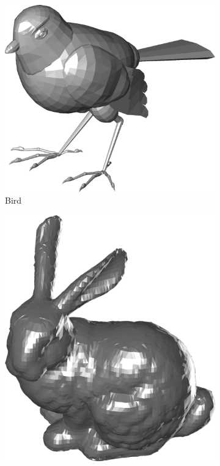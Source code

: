\begin{figure}
\begin{subfigure}[t]{0.19\linewidth}
	\end{subfigure}
	\begin{subfigure}[t]{0.19\linewidth} \centering
		\includegraphics[width=1\linewidth]{./fig/eval/03bird.png}  
		\caption{Bird} 	
	\end{subfigure}
	\begin{subfigure}[t]{0.19\linewidth} \centering
		\includegraphics[width=0.9\linewidth]{./fig/eval/04bunny.png}  

\end{subfigure}
\end{figure}
